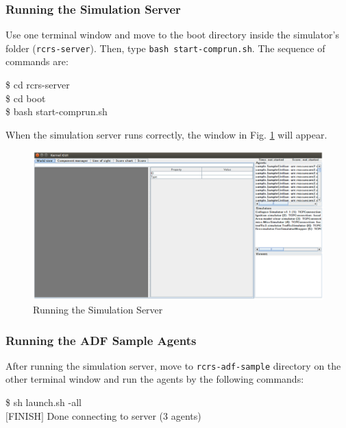 \documentclass[a4paper]{article}
\begin{document}
\subsubsection{Running the Simulation Server}
Use one terminal window and move to the boot directory inside the simulator's folder (\texttt{rcrs-server}). Then, type \texttt{bash start-comprun.sh}. The sequence of commands are:

\begin{center}
   \begin{tcolorbox}[title=Running Simulation Server, width=.98\linewidth]
    {\ttfamily
    \$ cd rcrs-server\\
    \$ cd boot\\
    \$ bash start-comprun.sh
    }
  \end{tcolorbox}
\end{center}

When the simulation server runs correctly, the window in Fig. \ref{fig:simulator01} will appear.

\begin{figure}[h]
 \begin{center}
  \includegraphics[width=.9\linewidth]{figs/simulator01.eps}
  \caption{Running the Simulation Server}
  \label{fig:simulator01}
 \end{center}
\end{figure}
\subsubsection{Running the ADF Sample Agents}
After running the simulation server, move to \texttt{rcrs-adf-sample} directory on the other terminal window and run the agents by the following commands:

\begin{center}
   \begin{tcolorbox}[title=Running Sample Agents, width=.98\linewidth]
    {\ttfamily
    \$ sh launch.sh -all\\
    $[$FINISH$]$ Done connecting to server (3 agents)
    }
  \end{tcolorbox}
\end{center}
\end{document}
